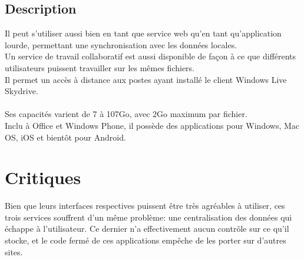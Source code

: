 \subsection{Description}
Il peut s'utiliser aussi bien en tant que service web qu'en tant qu'application lourde, permettant une synchronisation avec les données locales.\\
Un service de travail collaboratif est aussi disponible de façon à ce que différents utilisateurs puissent travailler sur les mêmes fichiers.\\
Il permet un accès à distance aux postes ayant installé le client Windows Live Skydrive.\\
\\
Ses capacités varient de 7 à 107Go, avec 2Go maximum par fichier.\\
Inclu à Office et Windows Phone, il possède des applications pour Windows, Mac OS, iOS et bientôt pour Android.\\


\section{Critiques}
Bien que leurs interfaces respectives puissent être très agréables à utiliser, ces trois services souffrent d'un même problème: une centralisation des données qui échappe à l'utilisateur. Ce dernier n'a effectivement aucun contrôle sur ce qu'il stocke, et le code fermé de ces applications empêche de les porter sur d'autres sites.